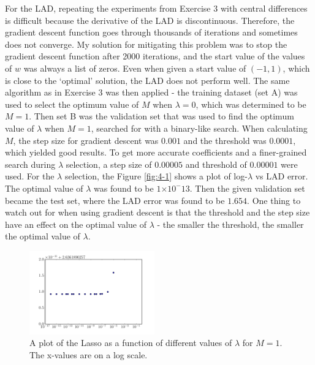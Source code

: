 \documentclass[10pt]{article}
\providecommand{\e}[1]{\ensuremath{\times 10^{#1}}}
\begin{document}
For the LAD, repeating the experiments from Exercise 3 with central differences is difficult because the derivative of the LAD is discontinuous. Therefore, the gradient descent function goes through thousands of iterations and sometimes does not converge. My solution for mitigating this problem was to stop the gradient descent function after 2000 iterations, and the start value of the values of $w$ was always a list of zeros. Even when given a start value of $(-1, 1)$, which is close to the `optimal' solution, the LAD does not perform well. The same algorithm as in Exercise 3 was then applied - the training dataset (set A) was used to select the optimum value of $M$ when $\lambda = 0$, which was determined to be $M = 1$. Then set B was the validation set that was used to find the optimum value of $\lambda$ when $M = 1$, searched for with a binary-like search. When calculating $M$, the step size for gradient descent was $0.001$ and the threshold was $0.0001$, which yielded good results. To get more accurate coefficients and a finer-grained search during $\lambda$ selection, a step size of $0.00005$ and threshold of $0.00001$ were used. For the $\lambda$ selection, the  Figure \ref{fig:4-1} shows a plot of log-$\lambda$ vs LAD error. The optimal value of $\lambda$ was found to be $1\e-13$. Then the given validation set became the test set, where the LAD error was found to be $1.654$. One thing to watch out for when using gradient descent is that the threshold and the step size have an effect on the optimal value of $\lambda$ - the smaller the threshold, the smaller the optimal value of $\lambda$. 

\begin{figure}[!ht]
	\vspace{-3mm}
	\begin{center}
	\includegraphics[width=0.48\textwidth]{exercise4-2.pdf}
	\caption{A plot of the Lasso as a function of different values of $\lambda$ for $M = 1$. The x-values are on a log scale.}
	\label{fig:4-2}
	\end{center}
	\vspace{-5mm}
\end{figure}
\end{document}
